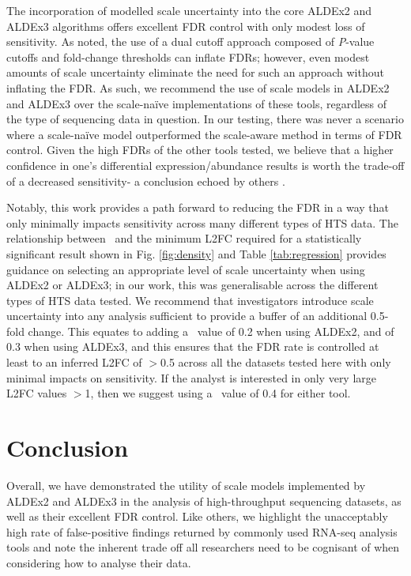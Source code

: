 \documentclass[10pt,letterpaper]{article}
\begin{document}
The incorporation of modelled scale uncertainty into the core ALDEx2 and ALDEx3 algorithms offers excellent FDR control with only modest loss of sensitivity. As noted, the use of a dual cutoff approach composed of \textit{P}-value cutoffs and fold-change thresholds can inflate FDRs; however, even modest amounts of scale uncertainty eliminate the need for such an approach without inflating the FDR. As such, we recommend the use of scale models in ALDEx2 and ALDEx3 over the scale-na\"ive implementations of these tools, regardless of the type of sequencing data in question. In our testing, there was never a scenario where a scale-na\"ive model outperformed the scale-aware method in terms of FDR control. Given the high FDRs of the other tools tested, we believe that a higher confidence in one's differential expression/abundance results is worth the trade-off of a decreased sensitivity- a conclusion echoed by others \cite{Nearing:2022aa, weiss_normalization_2017}. 

Notably, this work provides a path forward to reducing the FDR in a way that only minimally impacts sensitivity across many different types of HTS data. The relationship between \textgamma~and the minimum L2FC required for a statistically significant result shown in Fig. \ref{fig:density} and Table \ref{tab:regression} provides guidance on selecting an appropriate level of scale uncertainty when using ALDEx2 or ALDEx3; in our work, this was generalisable across the different types of HTS data tested. We recommend that investigators introduce scale uncertainty into any analysis sufficient to provide a buffer of an additional 0.5-fold change. This equates to adding a \textgamma~value of 0.2 when using ALDEx2, and of 0.3 when using ALDEx3, and this ensures that the FDR rate is controlled at least to an inferred L2FC of $>$0.5 across all the datasets tested here with only minimal impacts on sensitivity. If the analyst is interested in only very large L2FC values $>$1, then we suggest using a \textgamma~value of 0.4 for either tool.

\section*{Conclusion}
Overall, we have demonstrated the utility of scale models implemented by ALDEx2 and ALDEx3 in the analysis of high-throughput sequencing datasets, as well as their excellent FDR control. Like others, we highlight the unacceptably high rate of false-positive findings returned by commonly used RNA-seq analysis tools and note the inherent trade off all researchers need to be cognisant of when considering how to analyse their data.
\end{document}

